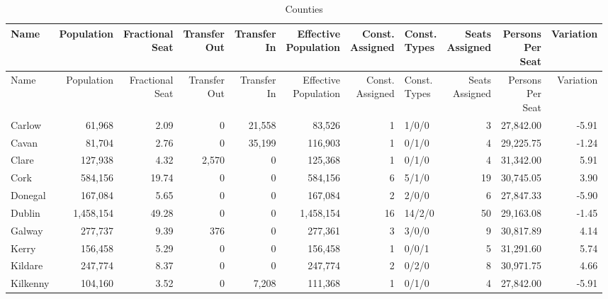 \documentclass[a4paper]{article}
\begin{document}
\begin{longtable}{lrrrrrrlrrr}
\caption{Counties}
\\ \toprule
Name &Population &\shortstack{Fractional\\Seat} &\shortstack{Transfer\\Out} &\shortstack{Transfer\\In} &\shortstack{Effective\\Population} &\shortstack{Const.\\Assigned} &\shortstack{Const.\\Types} &\shortstack{Seats\\Assigned} &\shortstack{Persons\\Per\\Seat} &Variation \\ \midrule
\endfirsthead
\toprule
Name &Population &\shortstack{Fractional\\Seat} &\shortstack{Transfer\\Out} &\shortstack{Transfer\\In} &\shortstack{Effective\\Population} &\shortstack{Const.\\Assigned} &\shortstack{Const.\\Types} &\shortstack{Seats\\Assigned} &\shortstack{Persons\\Per\\Seat} &Variation \\ \midrule
\endhead
\bottomrule
\endfoot
Carlow&61,968& 2.09&0&21,558&83,526&1&1/0/0&3&27,842.00&-5.91\\ 
Cavan&81,704& 2.76&0&35,199&116,903&1&0/1/0&4&29,225.75&-1.24\\ 
Clare&127,938& 4.32&2,570&0&125,368&1&0/1/0&4&31,342.00& 5.91\\ 
Cork&584,156&19.74&0&0&584,156&6&5/1/0&19&30,745.05& 3.90\\ 
Donegal&167,084& 5.65&0&0&167,084&2&2/0/0&6&27,847.33&-5.90\\ 
Dublin&1,458,154&49.28&0&0&1,458,154&16&14/2/0&50&29,163.08&-1.45\\ 
Galway&277,737& 9.39&376&0&277,361&3&3/0/0&9&30,817.89& 4.14\\ 
Kerry&156,458& 5.29&0&0&156,458&1&0/0/1&5&31,291.60& 5.74\\ 
Kildare&247,774& 8.37&0&0&247,774&2&0/2/0&8&30,971.75& 4.66\\ 
Kilkenny&104,160& 3.52&0&7,208&111,368&1&0/1/0&4&27,842.00&-5.91\\ 

\end{longtable}
\end{document}

